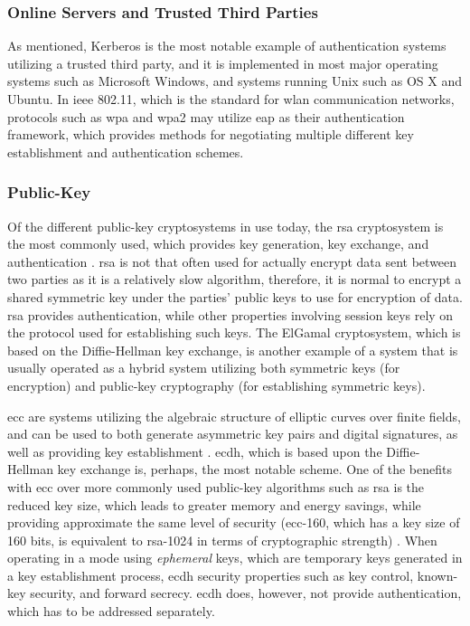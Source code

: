 \subsubsection{Online Servers and Trusted Third Parties}

As mentioned, Kerberos is the most notable example of authentication systems utilizing a trusted third party, and it is implemented in most major operating systems such as Microsoft Windows, and systems running Unix such as OS X and Ubuntu. In \gls{ieee} 802.11, which is the standard for \gls{wlan} communication networks, protocols such as \gls{wpa} and \gls{wpa2} may utilize \gls{eap} as their authentication framework, which provides methods for negotiating multiple different key establishment and authentication schemes.


\subsubsection{Public-Key}

Of the different public-key cryptosystems in use today, the \gls{rsa} cryptosystem is the most commonly used, which provides key generation, key exchange, and authentication \cite{wander2005energy}. \gls{rsa} is not that often used for actually encrypt data sent between two parties as it is a relatively slow algorithm, therefore, it is normal to encrypt a shared symmetric key under the parties' public keys to use for encryption of data. \gls{rsa} provides authentication, while other properties involving session keys rely on the protocol used for establishing such keys. The ElGamal cryptosystem, which is based on the Diffie-Hellman key exchange, is another example of a system that is usually operated as a hybrid system utilizing both symmetric keys (for encryption) and public-key cryptography (for establishing symmetric keys). 

\gls{ecc} are systems utilizing the algebraic structure of elliptic curves over finite fields, and can be used to both generate asymmetric key pairs and digital signatures, as well as providing key establishment \cite{bos2014elliptic}. \gls{ecdh}, which is based upon the Diffie-Hellman key exchange is, perhaps, the most notable scheme. One of the benefits with \gls{ecc} over more commonly used public-key algorithms such as \gls{rsa} is the reduced key size, which leads to greater memory and energy savings, while providing approximate the same level of security (\gls{ecc}-160, which has a key size of 160 bits, is equivalent to \gls{rsa}-1024 in terms of cryptographic strength) \cite{nist2016}.  When operating in a mode using \emph{ephemeral} keys, which are temporary keys generated in a key establishment process, \gls{ecdh} security properties such as key control, known-key security, and forward secrecy. \gls{ecdh} does, however, not provide authentication, which has to be addressed separately. 

